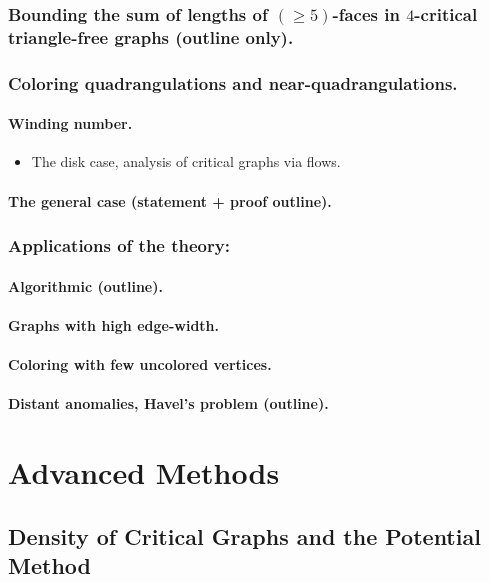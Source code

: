 \documentclass[12pt,twoside,openright,a4paper]{book}
\begin{document}

\section{Bounding the sum of lengths of $(\ge\!5)$-faces in $4$-critical triangle-free graphs (outline only).}
\section{Coloring quadrangulations and near-quadrangulations.}

\subsection{ Winding number.}
\begin{itemize}
\item The disk case, analysis of critical graphs via flows.
\end{itemize}

\subsection{The general case (statement + proof outline).}

\section{Applications of the theory:}
\subsection{Algorithmic (outline).}
\subsection{Graphs with high edge-width.}
\subsection{Coloring with few uncolored vertices.}
\subsection{Distant anomalies, Havel's problem (outline).}

\part{Advanced Methods}

\chapter{Density of Critical Graphs and the Potential Method}
\end{document}
